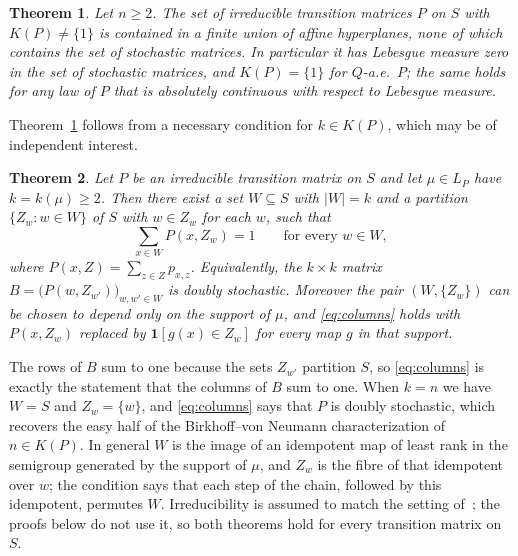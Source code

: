 \documentclass[11pt]{amsart}
\newtheorem{theorem}{Theorem}[section]
\theoremstyle{remark}
\begin{document}
\begin{theorem}\label{thm:main}
Let $n\ge2$. The set of irreducible transition matrices $P$ on $S$ with $K(P)\neq\{1\}$ is contained in a finite union
of affine hyperplanes, none of which contains the set of stochastic matrices. In particular it has Lebesgue measure
zero in the set of stochastic matrices, and $K(P)=\{1\}$ for $Q$-a.e.\ $P$; the same holds for any law of $P$ that is
absolutely continuous with respect to Lebesgue measure.
\end{theorem}

Theorem~\ref{thm:main} follows from a necessary condition for $k\in K(P)$, which may be of independent interest.

\begin{theorem}\label{thm:structure}
Let $P$ be an irreducible transition matrix on $S$ and let $\mu\in L_P$ have $k=k(\mu)\ge2$. Then there exist a set
$W\subseteq S$ with $|W|=k$ and a partition $\{Z_w:w\in W\}$ of $S$ with $w\in Z_w$ for each $w$, such that
\begin{equation}\label{eq:columns}
\sum_{x\in W}P(x,Z_w)=1\qquad\text{for every }w\in W,
\end{equation}
where $P(x,Z)=\sum_{z\in Z}p_{x,z}$. Equivalently, the $k\times k$ matrix $B=\bigl(P(w,Z_{w'})\bigr)_{w,w'\in W}$ is
doubly stochastic. Moreover the pair $(W,\{Z_w\})$ can be chosen to depend only on the support of $\mu$, and
\eqref{eq:columns} holds with $P(x,Z_w)$ replaced by $\mathbf{1}[g(x)\in Z_w]$ for every map $g$ in that support.
\end{theorem}

The rows of $B$ sum to one because the sets $Z_{w'}$ partition $S$, so \eqref{eq:columns} is exactly the statement
that the columns of $B$ sum to one. When $k=n$ we have $W=S$ and $Z_w=\{w\}$, and \eqref{eq:columns} says that $P$ is
doubly stochastic, which recovers the easy half of the Birkhoff--von Neumann characterization of $n\in K(P)$. In
general $W$ is the image of an idempotent map of least rank in the semigroup generated by the support of $\mu$, and
$Z_w$ is the fibre of that idempotent over $w$; the condition says that each step of the chain, followed by this
idempotent, permutes $W$. Irreducibility is assumed to match the setting of~\cite{GH26}; the proofs below do not use
it, so both theorems hold for every transition matrix on $S$.
\end{document}
